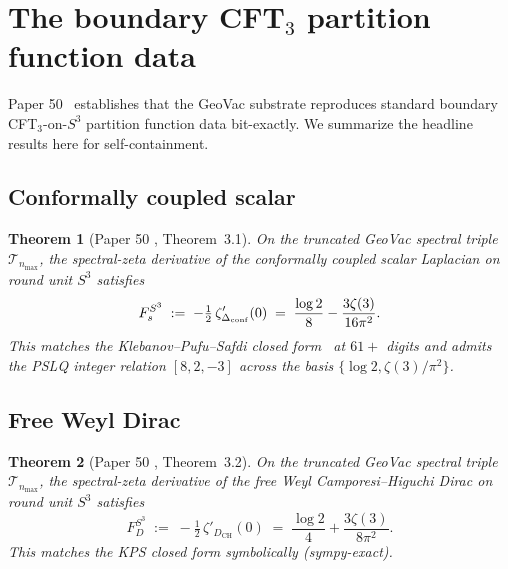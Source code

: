 \documentclass[11pt,a4paper]{article}
\theoremstyle{plain}
\newtheorem{theorem}{Theorem}[section]
\theoremstyle{definition}
\newcommand{\nmax}{n_{\max}}
\newcommand{\sthree}{S^{3}}
\newcommand{\Tcal}{\mathcal{T}}
\newcommand{\DCH}{D_{\mathrm{CH}}}
\begin{document}
\section{The boundary CFT$_{3}$ partition function data}
\label{sec:boundary_data}

Paper 50~\cite{paper50} establishes that the GeoVac substrate
reproduces standard boundary CFT$_{3}$-on-$\sthree$ partition function
data bit-exactly. We summarize the headline results here for
self-containment.

\subsection{Conformally coupled scalar}

\begin{theorem}[Paper 50 \cite{paper50}, Theorem~3.1]
\label{thm:scalar_match}
On the truncated GeoVac spectral triple $\Tcal_{\nmax}$, the
spectral-zeta derivative of the conformally coupled scalar Laplacian
on round unit $\sthree$ satisfies
\begin{equation}
F_{s}^{\sthree} \;:=\; -\tfrac{1}{2}\, \zeta'_{\Delta_{\rm conf}}(0)
\;=\; \frac{\log 2}{8} - \frac{3 \zeta(3)}{16 \pi^{2}}.
\label{eq:Fs_S3}
\end{equation}
This matches the Klebanov--Pufu--Safdi closed
form~\cite{klebanov_pufu_safdi2011} at $61+$ digits and admits the
PSLQ integer relation $[8, 2, -3]$ across the basis
$\{\log 2, \zeta(3)/\pi^{2}\}$.
\end{theorem}

\subsection{Free Weyl Dirac}

\begin{theorem}[Paper 50 \cite{paper50}, Theorem~3.2]
\label{thm:dirac_match}
On the truncated GeoVac spectral triple $\Tcal_{\nmax}$, the
spectral-zeta derivative of the free Weyl Camporesi--Higuchi Dirac
on round unit $\sthree$ satisfies
\begin{equation}
F_{D}^{\sthree} \;:=\; -\tfrac{1}{2}\, \zeta'_{\DCH}(0)
\;=\; \frac{\log 2}{4} + \frac{3 \zeta(3)}{8 \pi^{2}}.
\label{eq:FD_S3}
\end{equation}
This matches the KPS closed form symbolically (sympy-exact).
\end{theorem}
\end{document}
